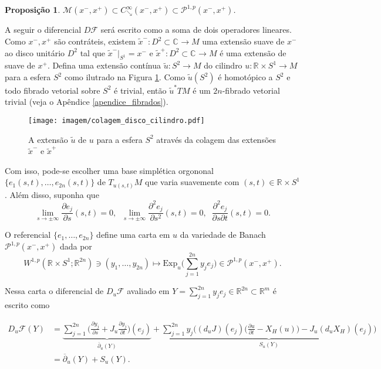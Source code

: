 \documentclass[12pt]{book}
\newtheorem{proposicao}[teorema]{Proposição}
\newcommand{\bigparenteses}[1]{\Big( #1 \Big) }
\newcommand{\caminhosdecaimentoexponencial}[2]{C^{\infty}_{\searrow}(#1, #2)}
\newcommand{\caminhosdecaimentoexponencialpadrao}{\caminhosdecaimentoexponencial{x^{-}}{x^{+}}}
\newcommand{\caminhosexponenciaisconectantes}[2]{\mathcal{P}^{1,p}(#1, #2)}
\newcommand{\caminhosexponenciaisconectantespadrao}{\caminhosexponenciaisconectantes{x^{-}}{x^{+}}}
\newcommand{\campohamiltoniano}[1]{X_{H}(#1)}
\newcommand{\campohamiltonianoabrev}{X_{H}}
\newcommand{\circulo}{S^{1}}
\newcommand{\complexo}[1]{\mathbb{C}^{#1}}
\newcommand{\diferencialfloer}{D\operadorFloer}
\newcommand{\diferencialfloerponto}[1]{D_{#1}\operadorFloer}
\newcommand{\derivadaparcial}[2]{\frac{\partial #1}{\partial #2}}
\newcommand{\energiafinitaM}{\mathcal{M}}
\newcommand{\energiafinitaMconectante}{\energiafinitaM(x^{-}, x^{+})}
\newcommand{\espacosobolevcontradominio}[2]{W^{1,p}(#1;#2)}
\newcommand{\espacotangenteponto}[2]{T_{#1}#2}
\newcommand{\Exp}{\text{Exp}}
\newcommand{\operadorFloer}{\mathcal{F}}
\newcommand{\pullbackfibradotangente}[2]{#1^{*}T#2}
\newcommand{\pullbackfibradotangenteM}[1]{\pullbackfibradotangente{#1}{M}}
\newcommand{\retacartesianocirculo}{\real{} \times \circulo}
\newcommand{\real}[1]{\mathbb{R}^{#1}}
\begin{document}
	\begin{proposicao}\label{proposicao_cadeia_caminhos_conectantes}
		$\energiafinitaMconectante \subset \caminhosdecaimentoexponencialpadrao \subset  \caminhosexponenciaisconectantespadrao$.
	\end{proposicao}
	
	
	A seguir o diferencial $\diferencialfloer$ será escrito como a soma de dois operadores lineares. Como $x^{-}, x^{+}$ são contráteis, existem $\tilde{x}^{-}:D^{2}\subset \complexo{} \to M$ uma extensão suave de $x^{-}$ ao disco unitário $D^{2}$ tal que  $\tilde{x}^{-}|_{\circulo} = x^{-}$ e $\tilde{x}^{+}:D^{2}\subset \complexo{} \to M$ é uma extensão de suave de $x^{+}$. Defina uma extensão contínua $\tilde{u}:S^{2}\to M$ do cilindro $u:\retacartesianocirculo\to M$ para a esfera $S^{2}$ como ilutrado na Figura \ref{figura_colagem_disco_cilindro}. Como $\tilde{u}(S^{2})$ é homotópico a $S^{2}$ e todo fibrado vetorial sobre $S^{2}$ é trivial, então $\pullbackfibradotangenteM{\tilde{u}}$ é um $2n$-fibrado vetorial trivial (veja o Apêndice \ref{apendice_fibrados}).
	
	\begin{figure}[!h]
		\centering
		\texttt{[image: imagem/colagem\_disco\_cilindro.pdf]}
		\caption{A extensão $\tilde{u}$ de $u$ para a esfera $S^{2}$ através da colagem das extensões $\tilde{x}^{-}$ e $\tilde{x}^{+}$}
		\label{figura_colagem_disco_cilindro}
	\end{figure}
	
	Com isso, pode-se escolher uma base simplética orgononal $\{e_{1}(s,t), \dots, e_{2n}(s,t)\}$ de $\espacotangenteponto{u(s,t)}{M}$ que varia suavemente com $(s,t)\in \retacartesianocirculo$. Além disso, suponha que
	$$
	\lim\limits_{s\to \pm \infty}\derivadaparcial{e_{j}}{s}(s,t)=0,\;\;	\lim\limits_{s\to \pm \infty}\frac{\partial^{2}e_{j}}{\partial s^{2}}(s,t)=0,\;\;\frac{\partial^{2}e_{j}}{\partial s \partial t}(s,t)=0.
	$$
	
	O referencial $\{e_{1}, \dots, e_{2n}\}$ define uma carta em $u$ da variedade de Banach $\caminhosexponenciaisconectantespadrao$ dada por
	$$
	\espacosobolevcontradominio{\retacartesianocirculo}{\real{2n}} \ni (y_{1}, \dots ,y_{2n})\mapsto \Exp_{u}\Big(\sum_{j=1}^{2n}y_{j}e_{j}\Big) \in \caminhosexponenciaisconectantespadrao.
	$$
	
	Nessa carta o diferencial de $\diferencialfloerponto{u}$ avaliado em $Y=\sum_{j=1}^{2n}y_{j}e_{j} \in \real{2n} \subset \real{m}$ é escrito como
	
	$$
	\begin{aligned}
	\diferencialfloerponto{u}(Y)
	&=\underbrace{
		\sum_{j=1}^{2n}\bigparenteses{\derivadaparcial{y_{j}}{s}+J_{u}\derivadaparcial{y_{j}}{t}}(e_{j}) }_{	\overline{\partial}_{u}(Y)}
	+ \underbrace{\sum_{j=1}^{2n}
		y_{j}\bigparenteses{(d_{u}J)(e_{j})\bigparenteses{ \derivadaparcial{u}{t} - \campohamiltoniano{u}}-J_{u}(d_{u}\campohamiltonianoabrev)(e_{j})}}_{S_{u}(Y)}
	\\
	&=
	\overline{\partial}_{u}(Y)+S_{u}(Y).
	\end{aligned}
	$$
	
\end{document}
